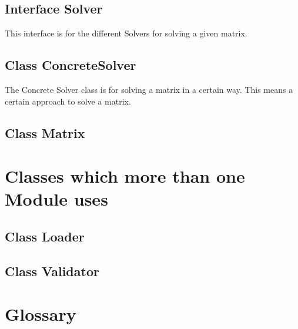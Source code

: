 \documentclass[parskip=full]{scrartcl}
\begin{document}
\subsection{Interface Solver}
This interface is for the different Solvers for solving a given matrix.
\subsection{Class ConcreteSolver}
The Concrete Solver class is for solving a matrix in a certain way.
This means a certain approach to solve a matrix.
\subsection{Class Matrix}
\section{Classes which more than one Module uses}
\subsection{Class Loader}

\subsection{Class Validator}







\section{Glossary}

%
\printnoidxglossaries
\end{document}
